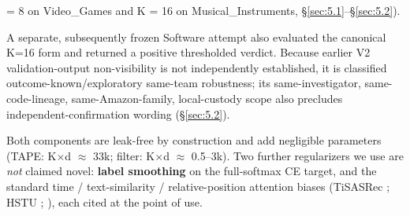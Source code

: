 = 8 on Video\_Games and K = 16 on Musical\_Instruments, \S\ref{sec:5.1}--\S\ref{sec:5.2}).

A separate, subsequently frozen Software attempt also evaluated the canonical K=16 form and returned a positive thresholded verdict. Because earlier V2 validation-output non-visibility is not independently established, it is classified outcome-known/exploratory same-team robustness; its same-investigator, same-code-lineage, same-Amazon-family, local-custody scope also precludes independent-confirmation wording (\S\ref{sec:5.2}).

Both components are leak-free by construction and add negligible parameters (TAPE: K\ensuremath{\times}d \ensuremath{\approx} 33k; filter: K\ensuremath{\times}d \ensuremath{\approx} 0.5--3k). Two further regularizers we use are \emph{not} claimed novel: \textbf{label smoothing} \citep{szegedy2016rethinking} on the full-softmax CE target, and the standard time / text-similarity / relative-position attention biases (TiSASRec \citep{li2020tisasrec}; HSTU \citep{zhai2024hstu}; \citealp{shaw2018relative}), each cited at the point of use.
